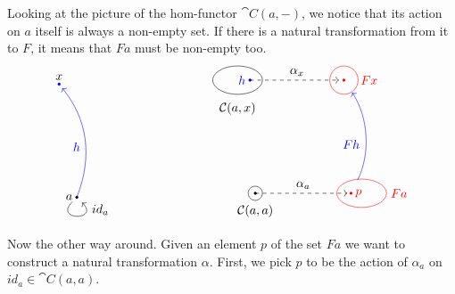 \documentclass[DaoFP]{subfiles}
\begin{document}
Looking at the picture of the hom-functor $\cat C(a, -)$, we notice that its action on $a$ itself is always a non-empty set. If there is a natural transformation from it to $F$, it means that $F a$ must be non-empty too.
\[
\begin{tikzpicture}
\def\ax{0}
\def\ay{0.5}
\def\xx{-0.5}
\def\xy{3.7}
\filldraw[black] (\ax, \ay) circle (1 pt);
\node (a) at (\ax, \ay) {};
\node[left] at (\ax, \ay) {$a$};
\filldraw[blue] (\xx, \xy) circle (1 pt);
\node[above] at (\xx, \xy) {$x$};

\draw [->] (a) edge[out=225, in=315, loop] (a);
\node[right] at (\ax + 0.3, \ay - 0.35) {$id_a$};

\draw[blue] (\ax, \ay) edge[->, "$h$", bend right, shorten > = 4 pt] (\xx, \xy);

\end{tikzpicture}
\hspace{80pt}
\begin{tikzpicture}

\def\ax{0}
\def\ay{0.5}
\def\xx{-0.5}
\def\xy{3.7}

\def\fax{3}
\def\fay{0.5}
\def\fxx{3 - 0.5}
\def\fxy{3.7}

\def\px{\fax - 0.3}
\def\hx{\xx + 0.35}
\draw[black] (\ax, \ay) circle (0.2);
\filldraw[black] (\ax, \ay) circle (1 pt);
\node[below] at (\ax, \ay-0.2) {$\cat C (a, a)$};
\draw[black] (\xx, \xy) ellipse (0.7 and 0.4);

\filldraw[blue] (\xx + 0.35, \xy) circle (1 pt);
\node[left, blue] at (\hx, \xy) {$h$};

\node[above] at (\xx, \xy - 1.1) {$\cat C (a, x)$};
\draw[dashed] (\hx, \xy) edge[->, "$\alpha_x$", shorten > = 4 pt] (\fxx, \fxy);

\draw[red] (\fax, \fay) ellipse (0.7 and 0.4);
\filldraw[red] (\px, \fay) circle (1 pt);
\node[right, red] at (\px, \fay) {$p$};
\node[right, red] at (\fax + 0.7, \fay) {$F a$};
\draw[dashed] (\ax, \ay) edge[->, "$\alpha_a$", shorten > = 3 pt] (\px, \fay);
\draw[red] (\fxx, \fxy) circle (0.4);
\filldraw[red] (\fxx, \fxy) circle (1 pt);
\node[right, red] at (\fxx + 0.35, \fxy) {$F x$};

\draw[blue] (\px, \fay) edge[->, "$F h$", bend right, shorten > = 12, shorten < = 12] (\fxx, \fxy);

\end{tikzpicture}
\]


Now the other way around. Given an element $p$ of the set $F a$ we want to construct a natural transformation $\alpha$. First, we pick $p$ to be the action of $\alpha_a$ on $id_a \in \cat C(a, a)$. 
\end{document}
